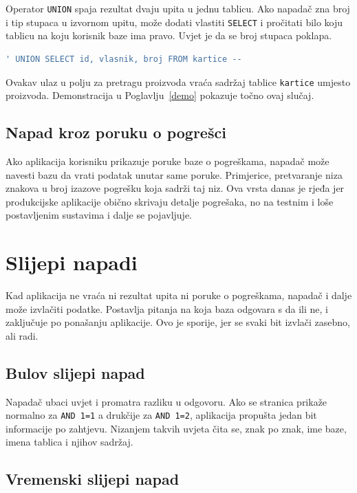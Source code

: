 \documentclass{mathos}
\begin{document}
Operator \verb|UNION| spaja rezultat dvaju upita u jednu tablicu. Ako napadač zna broj i tip stupaca u izvornom upitu, može dodati vlastiti \verb|SELECT| i pročitati bilo koju tablicu na koju korisnik baze ima pravo. Uvjet je da se broj stupaca poklapa.

\begin{lstlisting}[language=SQL]
' UNION SELECT id, vlasnik, broj FROM kartice --
\end{lstlisting}

\noindent
Ovakav ulaz u polju za pretragu proizvoda vraća sadržaj tablice \verb|kartice| umjesto proizvoda. Demonstracija u Poglavlju~\ref{demo} pokazuje točno ovaj slučaj.

\subsection{Napad kroz poruku o pogrešci}

Ako aplikacija korisniku prikazuje poruke baze o pogreškama, napadač može navesti bazu da vrati podatak unutar same poruke. Primjerice, pretvaranje niza znakova u broj izazove pogrešku koja sadrži taj niz. Ova vrsta danas je rjeđa jer produkcijske aplikacije obično skrivaju detalje pogrešaka, no na testnim i loše postavljenim sustavima i dalje se pojavljuje.

\section{Slijepi napadi}

Kad aplikacija ne vraća ni rezultat upita ni poruke o pogreškama, napadač i dalje može izvlačiti podatke. Postavlja pitanja na koja baza odgovara s da ili ne, i zaključuje po ponašanju aplikacije. Ovo je sporije, jer se svaki bit izvlači zasebno, ali radi.

\subsection{Bulov slijepi napad}

Napadač ubaci uvjet i promatra razliku u odgovoru. Ako se stranica prikaže normalno za \verb|AND 1=1| a drukčije za \verb|AND 1=2|, aplikacija propušta jedan bit informacije po zahtjevu. Nizanjem takvih uvjeta čita se, znak po znak, ime baze, imena tablica i njihov sadržaj.

\subsection{Vremenski slijepi napad}
\end{document}
